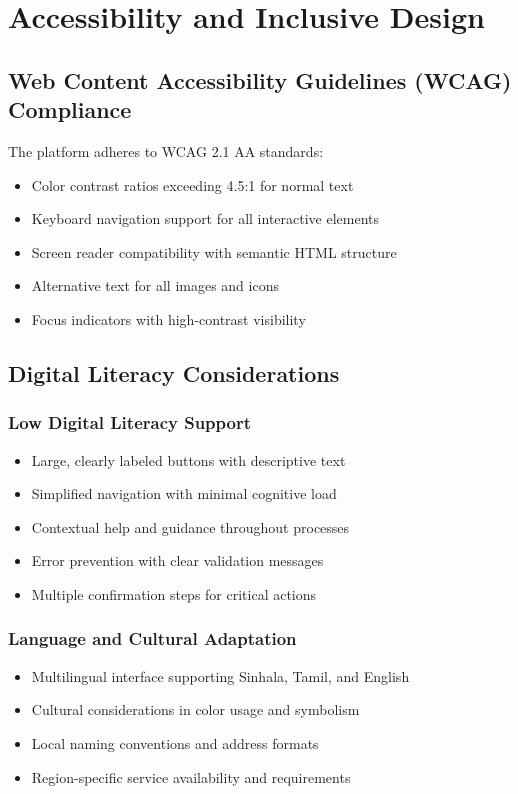 \documentclass[12pt,a4paper]{article}
\begin{document}
\section{Accessibility and Inclusive Design}

\subsection{Web Content Accessibility Guidelines (WCAG) Compliance}

The platform adheres to WCAG 2.1 AA standards:

\begin{itemize}
    \item Color contrast ratios exceeding 4.5:1 for normal text
    \item Keyboard navigation support for all interactive elements
    \item Screen reader compatibility with semantic HTML structure
    \item Alternative text for all images and icons
    \item Focus indicators with high-contrast visibility
\end{itemize}

\subsection{Digital Literacy Considerations}

\subsubsection{Low Digital Literacy Support}
\begin{itemize}
    \item Large, clearly labeled buttons with descriptive text
    \item Simplified navigation with minimal cognitive load
    \item Contextual help and guidance throughout processes
    \item Error prevention with clear validation messages
    \item Multiple confirmation steps for critical actions
\end{itemize}

\subsubsection{Language and Cultural Adaptation}
\begin{itemize}
    \item Multilingual interface supporting Sinhala, Tamil, and English
    \item Cultural considerations in color usage and symbolism
    \item Local naming conventions and address formats
    \item Region-specific service availability and requirements
\end{itemize}
\end{document}

